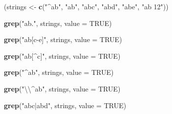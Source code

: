 \documentclass[]{book}
\newenvironment{Shaded}{\begin{snugshade}}{\end{snugshade}}
\newcommand{\KeywordTok}[1]{\textcolor[rgb]{0.13,0.29,0.53}{\textbf{#1}}}
\newcommand{\DataTypeTok}[1]{\textcolor[rgb]{0.13,0.29,0.53}{#1}}
\newcommand{\CharTok}[1]{\textcolor[rgb]{0.31,0.60,0.02}{#1}}
\newcommand{\StringTok}[1]{\textcolor[rgb]{0.31,0.60,0.02}{#1}}
\newcommand{\OtherTok}[1]{\textcolor[rgb]{0.56,0.35,0.01}{#1}}
\newcommand{\NormalTok}[1]{#1}
\theoremstyle{definition}
\theoremstyle{definition}
\theoremstyle{definition}
\theoremstyle{remark}
\begin{document}
\begin{Shaded}
\begin{Highlighting}[]
\NormalTok{(strings <-}\StringTok{ }\KeywordTok{c}\NormalTok{(}\StringTok{"^ab"}\NormalTok{, }\StringTok{"ab"}\NormalTok{, }\StringTok{"abc"}\NormalTok{, }\StringTok{"abd"}\NormalTok{, }\StringTok{"abe"}\NormalTok{, }\StringTok{"ab 12"}\NormalTok{))}
\end{Highlighting}
\end{Shaded}

\begin{Shaded}
\begin{Highlighting}[]
\KeywordTok{grep}\NormalTok{(}\StringTok{"ab."}\NormalTok{, strings, }\DataTypeTok{value =} \OtherTok{TRUE}\NormalTok{) }
\end{Highlighting}
\end{Shaded}

\begin{Shaded}
\begin{Highlighting}[]
\KeywordTok{grep}\NormalTok{(}\StringTok{"ab[c-e]"}\NormalTok{, strings, }\DataTypeTok{value =} \OtherTok{TRUE}\NormalTok{)}
\end{Highlighting}
\end{Shaded}

\begin{Shaded}
\begin{Highlighting}[]
\KeywordTok{grep}\NormalTok{(}\StringTok{"ab[^c]"}\NormalTok{, strings, }\DataTypeTok{value =} \OtherTok{TRUE}\NormalTok{)}
\end{Highlighting}
\end{Shaded}

\begin{Shaded}
\begin{Highlighting}[]
\KeywordTok{grep}\NormalTok{(}\StringTok{"^ab"}\NormalTok{, strings, }\DataTypeTok{value =} \OtherTok{TRUE}\NormalTok{) }
\end{Highlighting}
\end{Shaded}

\begin{Shaded}
\begin{Highlighting}[]
\KeywordTok{grep}\NormalTok{(}\StringTok{"}\CharTok{\textbackslash{}\textbackslash{}}\StringTok{^ab"}\NormalTok{, strings, }\DataTypeTok{value =} \OtherTok{TRUE}\NormalTok{) }
\end{Highlighting}
\end{Shaded}

\begin{Shaded}
\begin{Highlighting}[]
\KeywordTok{grep}\NormalTok{(}\StringTok{"abc|abd"}\NormalTok{, strings, }\DataTypeTok{value =} \OtherTok{TRUE}\NormalTok{) }
\end{Highlighting}
\end{Shaded}
\end{document}
